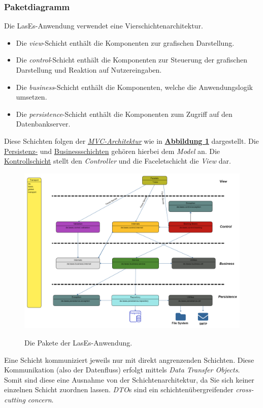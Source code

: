 \subsubsection{Paketdiagramm}

Die LasEs-Anwendung verwendet eine Vierschichtenarchitektur.
\begin{itemize}
    \item Die \emph{view}-Schicht enthält die Komponenten zur grafischen Darstellung.
    \item Die \emph{control}-Schicht enthält die Komponenten zur Steuerung der grafischen Darstellung und Reaktion auf
    Nutzereingaben.
    \item Die \emph{business}-Schicht enthält die Komponenten, welche die Anwendungslogik umsetzen.
    \item Die \emph{persistence}-Schicht enthält die Komponenten zum Zugriff auf den Datenbankserver.
\end{itemize}
Diese Schichten folgen der \emph{\hyperref[arch:mvc]{MVC-Architektur}} wie in
\textbf{\hyperref[feinarch:pakdia]{Abbildung 1}} dargestellt.
Die \hyperref[arch:persistence]{Persistenz-} und
\hyperref[arch:business]{Businessschichten} gehören hierbei
dem \emph{Model} an. Die \hyperref[arch:control]{Kontrollschicht} stellt den \emph{Controller} und die
Faceletschicht die \emph{View} dar.
\begin{figure}[H]
    \centering
    \includegraphics[width=0.8\linewidth]{graphics/Paketdiagramm11.0}\label{feinarch:pakdia}
    \caption{Die Pakete der LasEs-Anwendung.}
\end{figure}

Eine Schicht kommuniziert jeweils nur mit direkt angrenzenden Schichten.
Diese Kommunikation (also der Datenfluss) erfolgt mittels \emph{Data Transfer Objects}.
Somit sind diese eine Ausnahme von der Schichtenarchitektur, da Sie sich keiner
einzelnen Schicht zuordnen lassen.
\emph{DTO}s sind ein schichtenübergreifender \emph{cross-cutting concern}.

